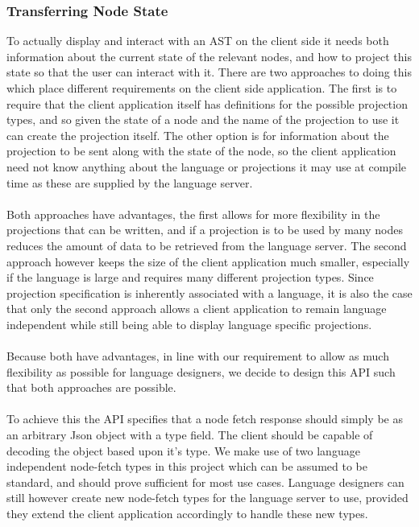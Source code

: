 \documentclass{article}
\begin{document}
\subsubsection{Transferring Node State}\label{apiNodeStateTransfer}
To actually display and interact with an AST on the client side it needs both information about the current state of the relevant nodes, and how to project this state so that the user can interact with it. 
There are two approaches to doing this which place different requirements on the client side application. The first is to require that the client application itself has definitions for the possible projection types, and so given the state of a node and the name of the projection to use it can create the projection itself. The other option is for information about the projection to be sent along with the state of the node, so the client application need not know anything about the language or projections it may use at compile time as these are supplied by the language server.
\\
\\
Both approaches have advantages, the first allows for more flexibility in the projections that can be written, and if a projection is to be used by many nodes reduces the amount of data to be retrieved from the language server. The second approach however keeps the size of the client application much smaller, especially if the language is large and requires many different projection types. Since projection specification is inherently associated with a language, it is also the case that only the second approach allows a client application to remain language independent while still being able to display language specific projections.
\\
\\
Because both have advantages, in line with our \RCustom requirement to allow as much flexibility as possible for language designers, we decide to design this API such that both approaches are possible.
\\
\\
To achieve this the API specifies that a node fetch response should simply be as an arbitrary Json object with a type field. The client should be capable of decoding the object based upon it's type. We make use of two language independent node-fetch types in this project which can be assumed to be standard, and should prove sufficient for most use cases. Language designers can still however create new node-fetch types for the language server to use, provided they extend the client application accordingly to handle these new types. 
\end{document}
